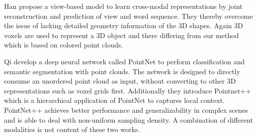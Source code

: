 \documentclass[10pt,twocolumn,letterpaper]{article}
\begin{document}
Han \etal \cite{han2018seq2seq} propose a view-based model to learn cross-modal representations by joint reconstruction and prediction of view and word sequence. They thereby overcome the issue of lacking detailed geometry information of the 3D shapes. Again 3D voxels are used to represent a 3D object and there differing from our method which is based on colored point clouds.  

Qi \etal develop a deep neural network called PointNet \cite{qi2017pointnet} to perform classification and semantic segmentation with point clouds. The network is designed to directly consume an unordered point cloud as input, without converting to other 3D representations such as voxel grids first. Additionally they introduce Pointnet++ \cite{bibid} which is a hierarchical application of PointNet to captures local context. PointNet++ achieves better performance and generalizability in complex scenes and is able to deal with non-uniform sampling density. A combination of different modalities is not content of these two works. 
\end{document}
